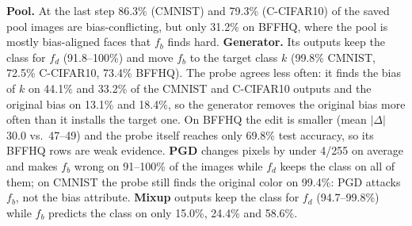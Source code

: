 \textbf{Pool.} At the last step 86.3\% (CMNIST) and 79.3\% (C-CIFAR10) of the saved pool images are bias-conflicting,
but only 31.2\% on BFFHQ, where the pool is mostly bias-aligned faces that $f_b$ finds hard.
\textbf{Generator.} Its outputs keep the class for $f_d$ (91.8--100\%) and move $f_b$ to the target class $k$
(99.8\% CMNIST, 72.5\% C-CIFAR10, 73.4\% BFFHQ). The probe agrees less often: it finds the bias of $k$ on 44.1\% and
33.2\% of the CMNIST and C-CIFAR10 outputs and the original bias on 13.1\% and 18.4\%, so the generator removes the
original bias more often than it installs the target one. On BFFHQ the edit is smaller (mean $|\Delta|$ 30.0 vs.\
47--49) and the probe itself reaches only 69.8\% test accuracy, so its BFFHQ rows are weak evidence.
\textbf{PGD} changes pixels by under 4/255 on average and makes $f_b$ wrong on 91--100\% of the images while $f_d$
keeps the class on all of them; on CMNIST the probe still finds the original color on 99.4\%: PGD attacks $f_b$,
not the bias attribute. \textbf{Mixup} outputs keep the class for $f_d$ (94.7--99.8\%) while $f_b$ predicts the
class on only 15.0\%, 24.4\% and 58.6\%.
